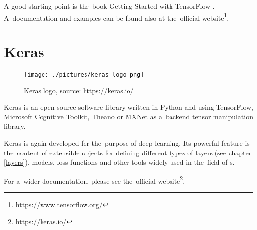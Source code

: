 A good starting point is the~book Getting Started with TensorFlow \cite{tf}.
A~documentation and examples can be found also at the~official 
website\footnote{\url{https://www.tensorflow.org/}}.

\section{Keras}
\label{keras}

\begin{figure}[H]
   \centering
	\texttt{[image: ./pictures/keras-logo.png]}
	\caption[Keras logo]{Keras logo, source: \url{https://keras.io/}}
      \label{fig:keras-logo}
\end{figure}

Keras is an open-source software library written in Python and using TensorFlow, 
Microsoft Cognitive Toolkit, Theano or MXNet as a~backend tensor manipulation 
library.

Keras is again developed for the~purpose of deep learning. Its powerful feature 
is the~content of extensible objects for defining different types of layers (see 
chapter \ref{layers}), models, loss functions and other tools widely used in
the~field of s.

For a~wider documentation, please see the~official 
website\footnote{\url{https://keras.io/}}.
